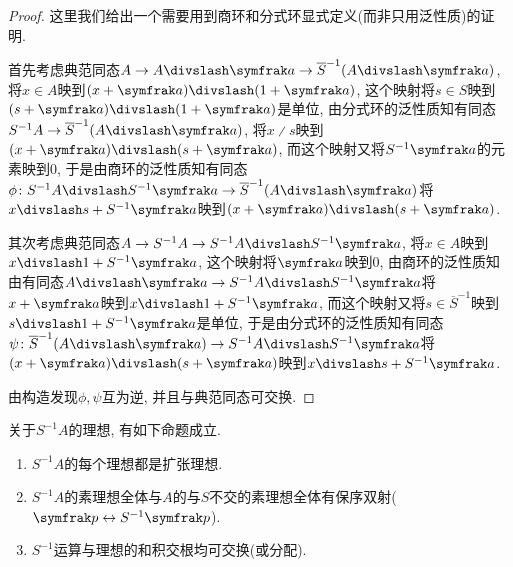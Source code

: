 \begin{proof}
    这里我们给出一个需要用到商环和分式环显式定义(而非只用泛性质)的证明.

    首先考虑典范同态$A\to A{\divslash}\ideal{a}\to \SAa$, 将$x\in A$映到$(x+\ideal{a}){\divslash}(1+\ideal{a})$, 这个映射将$s\in S$映到$(s+\ideal{a}){\divslash}(1+\ideal{a})$是单位, 由分式环的泛性质知有同态$S^{-1}A\to \SAa$, 将$x{\divslash}s$映到$(x+\ideal{a}){\divslash}(s+\ideal{a})$, 而这个映射又将$S^{-1}\ideal{a}$的元素映到0, 于是由商环的泛性质知有同态$\phi\colon\SASa\to\SAa$将$x{\divslash}s + S^{-1}\ideal{a}$映到$(x+\ideal{a}){\divslash}(s+\ideal{a})$.

    其次考虑典范同态$A\to S^{-1}A\to\SASa$, 将$x\in A$映到$x{\divslash}1+S^{-1}\ideal{a}$, 这个映射将$\ideal{a}$映到0, 由商环的泛性质知由有同态$A{\divslash}\ideal{a}\to\SASa$将$x+\ideal{a}$映到$x{\divslash}1+S^{-1}\ideal{a}$, 而这个映射又将$s\in\overline{S}^{-1}$映到$s{\divslash}1+S^{-1}\ideal{a}$是单位, 于是由分式环的泛性质知有同态$\psi\colon\SAa\to\SASa$将$(x+\ideal{a}){\divslash}(s+\ideal{a})$映到$x{\divslash}s + S^{-1}\ideal{a}$.

    由构造发现$\phi, \psi$互为逆, 并且与典范同态可交换.
\end{proof}

\begin{proposition}\label{prop:fracideal}
    关于$S^{-1}A$的理想, 有如下命题成立.
    \begin{enumerate}
        \item\label{enum:prop-fracideal-1} $S^{-1}A$的每个理想都是扩张理想.
        \item\label{enum:prop-fracideal-2} $S^{-1}A$的素理想全体与$A$的与$S$不交的素理想全体有保序双射($\ideal{p}\leftrightarrow S^{-1}\ideal{p}$).
        \item\label{enum:prop-fracideal-3} $S^{-1}$运算与理想的和积交根均可交换(或分配). %
    \end{enumerate}
\end{proposition}

